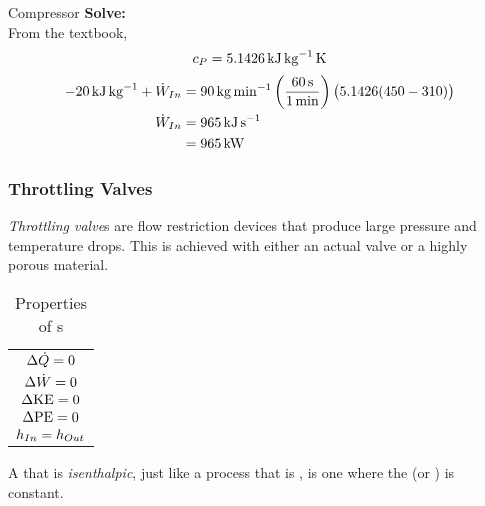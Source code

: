 \begin{example}{Compressor}
  \textbf{Solve:} \\
  From the textbook,
  \begin{equation*}
    c_{P} = \SI{5.1426}{\kilo\joule\per\kilo\gram\kelvin}
  \end{equation*}
  \begin{align*}
    -\SI{20}{\kilo\joule\per\kilo\gram} + \dot{W}_{In} &= \SI{90}{\kilo\gram\per\minute} \left( \frac{\SI{60}{\second}}{\SI{1}{\minute}} \right) \bigl( 5.1426 (450 - 310) \bigr) \\
    \dot{W}_{In} &= \SI{965}{\kilo\joule\per\second} \\
                                                                &= \SI{965}{\kilo\watt}
  \end{align*}
\end{example}

\subsubsection{Throttling Valves}\label{subsubsec:Throttling_Valves}
\begin{definition}\label{def:Throttling_Valve}
  \emph{Throttling valve}s are flow restriction devices that produce large pressure and temperature drops.
  This is achieved with either an actual valve or a highly porous material.
\end{definition}

\begin{table}[h!tbp]
  \centering
  \begin{tabular}{c}
    \toprule
    \nameref{def:Throttling_Valve} \\
    \midrule
    $\Delta \dot{Q} = 0$ \\
    $\Delta \dot{W} = 0$ \\
    $\Delta \mathrm{KE} = 0$ \\
    $\Delta \mathrm{PE} = 0$ \\
    $h_{In} = h_{Out}$ \\
    \bottomrule
  \end{tabular}
  \caption{Properties of s}
  \label{tab:Throttling_Valve_Properties}
\end{table}

\begin{definition}[Isenthalpic]\label{def:Isenthalpic}
  A  that is \emph{isenthalpic}, just like a process that is , is one where the  (or ) is constant.
\end{definition}

